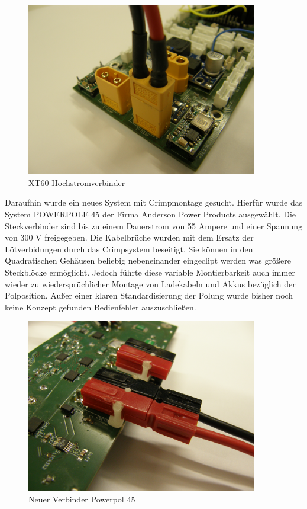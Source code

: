\begin{figure}[H]
\centering
\includegraphics[width=0.9\textwidth, center]{bilder/Stecker/Stecker_XT60.jpg} 
\caption{XT60 Hochstromverbinder} 
\label{fig:XT60 Hochstromverbinder}
\end{figure}

Daraufhin wurde ein neues System mit Crimpmontage gesucht.
Hierfür wurde das System POWERPOLE 45 der Firma Anderson Power Products ausgewählt. Die Steckverbinder sind bis zu einem Dauerstrom von 55 Ampere und einer Spannung von 300 V freigegeben.
Die Kabelbrüche wurden mit dem Ersatz der Lötverbidungen durch das Crimpsystem beseitigt. Sie können in den Quadratischen Gehäusen beliebig nebeneinander eingeclipt werden was größere Steckblöcke ermöglicht. Jedoch führte diese variable Montierbarkeit auch immer wieder zu wiedersprüchlicher Montage von Ladekabeln und Akkus bezüglich der Polposition.
Außer einer klaren Standardisierung der Polung wurde bisher noch keine Konzept gefunden Bedienfehler auszuschließen. 

\begin{figure}[H]
\centering
\includegraphics[width=0.9\textwidth, center]{bilder/Stecker/Stecker_Anderson_Powerpol.jpg} 
\caption{Neuer Verbinder  Powerpol 45} 
\label{fig:Neuer Verbinder  Powerpol 45}
\end{figure}


